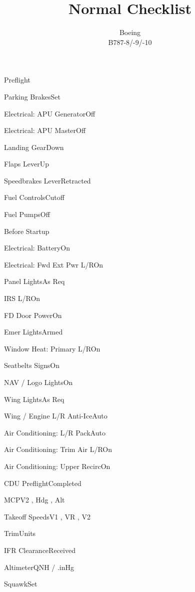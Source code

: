 \documentclass[sim-use, halfpage]{checklist}
\title{Normal Checklist}
\subtitle{Boeing \\ B787-8/-9/-10}
\begin{document}
  

\begin{checklist}{Preflight}
  \item{Parking Brakes}{Set}
  \item{Electrical: APU Generator}{Off}
  \item{Electrical: APU Master}{Off}
  \item{Landing Gear}{Down}
  \item{Flaps Lever}{Up}
  \item{Speedbrakes Lever}{Retracted}
  \item{Fuel Controls}{Cutoff}
  \item{Fuel Pumps}{Off}
\end{checklist}

\begin{checklist}{Before Startup}
  \item{Electrical: Battery}{On}
  \item{Electrical: Fwd Ext Pwr L/R}{On}
  \item{Panel Lights}{As Req}
  \item{IRS L/R}{On}
  \item{FD Door Power}{On}
  \item{Emer Lights}{Armed}
  \item{Window Heat: Primary L/R}{On}
  \item{Seatbelts Signs}{On}
  \item{NAV / Logo Lights}{On}
  \item{Wing Lights}{As Req}
  \item{Wing / Engine L/R Anti-Ice}{Auto}
  \item{Air Conditioning: L/R Pack}{Auto}
  \item{Air Conditioning: Trim Air L/R}{On}
  \item{Air Conditioning: Upper Recirc}{On}
  \item{CDU Preflight}{Completed}
  \item{MCP}{V2 \blank, Hdg \blank, Alt \blank}
  \item{Takeoff Speeds}{V1 \blank, VR \blank, V2 \blank}
  \item{Trim}{\blank Units}
  \item{IFR Clearance}{Received}
  \item{Altimeter}{\blank QNH / \blank.\blank inHg}
  \item{Squawk}{Set}
\end{checklist}
\end{document}
